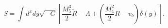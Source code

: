 \begin{equation}
\label{action1}
S = \int d^x dy \sqrt{-G}
\left[ \frac{M_5^3}{2} \tilde{R} - \Lambda + 
       \left( \frac{M_4^2}{2} R - v_b \right) \delta(y) \right].
\end{equation}

